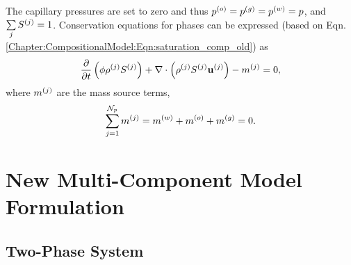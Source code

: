 The capillary pressures are set to zero and thus $\mfr[p]{}{o} = \mfr[p]{}{g} = \mfr[p]{}{w}  = p $, and $\summation_{j}\mfr[S]{}{j} = 1$. Conservation equations for phases can be expressed (based on Eqn. \ref{Chapter:CompositionalModel:Eqn:saturation_comp_old}) as 
   \begin{equation}
       \displaystyle\frac{\partial}{\partial t}\left(\phi\mfr[\rho]{}{j}\mfr[S]{}{j}\right) + \nabla\cdot\left(\mfr[\rho]{}{j}\mfr[S]{}{j}\mfr[\mathbf{u}]{}{j}\right) -\mfr[m]{}{j} = 0, 
              \label{saturation_compositional_1}
   \end{equation}
where $\mfr[m]{}{j}$ are the mass source terms,
   \begin{displaymath}
      \summation_{j=1}^{{\cal N}_p} \mfr[m]{}{j}=\mfr[m]{}{w}+\mfr[m]{}{o}+\mfr[m]{}{g}=0. 
   \end{displaymath}

\section{New Multi-Component Model Formulation}\label{Chapter:CompositionalModel:Section:MultiComponentFormulation}

\subsection{Two-Phase System}\label{Chapter:CompositionalModel:Section:MultiComponentFormulation:Section:2PhaseSystem}

